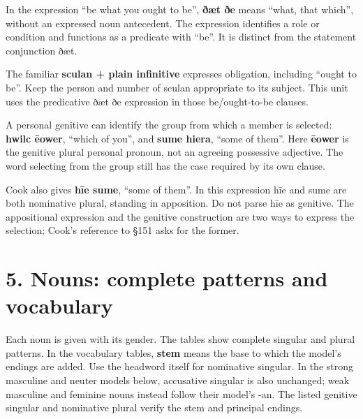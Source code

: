 In the expression “be what you ought to be”, \textbf{ðæt ðe} means “what, that which”, without an expressed noun antecedent. The expression identifies a role or condition and functions as a predicate with “be”. It is distinct from the statement conjunction ðæt.

The familiar \textbf{sculan + plain infinitive} expresses obligation, including “ought to be”. Keep the person and number of sculan appropriate to its subject. This unit uses the predicative ðæt ðe expression in those be/\allowbreak{}ought-to-be clauses.

A personal genitive can identify the group from which a member is selected: \textbf{hwilc ēower}, “which of you”, and \textbf{sume hiera}, “some of them”. Here \textbf{ēower} is the genitive plural personal pronoun, not an agreeing possessive adjective. The word selecting from the group still has the case required by its own clause.

Cook also gives \textbf{hīe sume}, “some of them”. In this expression hīe and sume are both nominative plural, standing in apposition. Do not parse hīe as genitive. The appositional expression and the genitive construction are two ways to express the selection; Cook’s reference to §151 asks for the former.

\section*{5. Nouns: complete patterns and vocabulary}

Each noun is given with its gender. The tables show complete singular and plural patterns. In the vocabulary tables, \textbf{stem} means the base to which the model’s endings are added. Use the headword itself for nominative singular. In the strong masculine and neuter models below, accusative singular is also unchanged; weak masculine and feminine nouns instead follow their model’s -an. The listed genitive singular and nominative plural verify the stem and principal endings.

